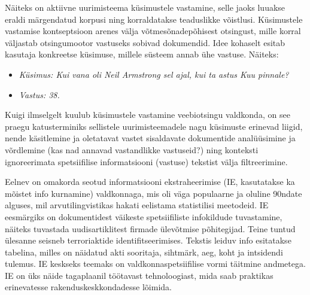\begin{multicols}{2}


Näiteks on aktiivne uurimisteema küsimustele vastamine, selle jaoks luuakse eraldi märgendatud korpusi ning korraldatakse teaduslikke võistlusi.  Küsimustele vastamise kontseptsioon arenes välja võtmesõnadepõhisest otsingust, mille korral väljastab otsingumootor vastuseks sobivad dokumendid.  Idee kohaselt esitab kasutaja konkreetse küsimuse, millele süsteem annab ühe vastuse. Näiteks:

\begin{itemize}
\item[] \textit{Küsimus: Kui vana oli Neil Armstrong sel ajal, kui ta astus Kuu pinnale?}
\item[] \textit{Vastus: 38.}
\end{itemize}

Kuigi ilmselgelt kuulub küsimustele vastamine veebiotsingu valdkonda, on see praegu katusterminiks sellistele uurimisteemadele nagu küsimuste erinevad liigid, nende käsitlemine ja oletatavat vastet sisaldavate dokumentide analüüsimine ja võrdlemine (kas nad annavad vastandlikke vastuseid?) ning konteksti ignoreerimata spetsiifilise informatsiooni (vastuse) tekstist välja filtreerimine.

Eelnev on omakorda seotud informatsiooni ekstraheerimise (IE, kasutatakse ka mõistet info kurnamine) valdkonnaga, mis oli väga populaarne ja oluline 90ndate alguses, mil arvutilingvistikas hakati eelistama statistilisi meetodeid.  IE eesmärgiks on dokumentidest väikeste spetsiifiliste infokildude tuvastamine, näiteks tuvastada uudisartiklitest firmade ülevõtmise põhitegijad.  Teine tuntud ülesanne seisneb terroriaktide identifitseerimises.  Tekstis leiduv info esitatakse tabelina, milles on näidatud akti sooritaja, sihtmärk, aeg, koht ja intsidendi tulemus.  IE keskseks teemaks on valdkonnaspetsiifilise vormi täitmine andmetega.  IE on üks näide tagaplaanil töötavast tehnoloogiast, mida saab praktikas erinevatesse rakenduskeskkondadesse lõimida.


\end{multicols}
